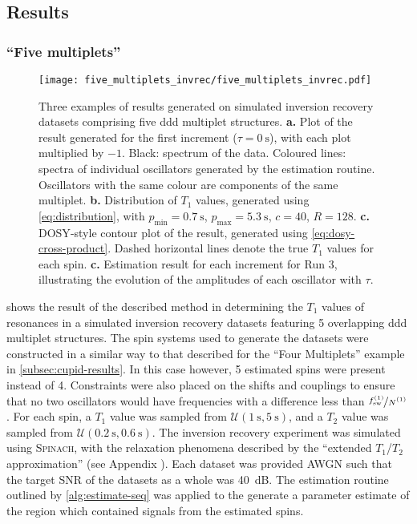 \subsection{Results}
\label{subsec:seq-results}
\subsubsection{``Five multiplets''}
\begin{figure}
    \texttt{[image: five\_multiplets\_invrec/five\_multiplets\_invrec.pdf]}
    \caption[
        Three examples of results generated on simulated inversion recovery
        datasets comprising five ddd multiplet structures.
    ]
    {
        Three examples of results generated on
        simulated inversion recovery datasets comprising five ddd multiplet
        structures.
        \textbf{a.} Plot of the result generated for the first increment ($\tau
        = \qty{0}{\second}$), with each plot multiplied by $-1$. Black:
        spectrum of the data. Coloured lines: spectra of individual oscillators
        generated by the estimation routine. Oscillators with the same colour
        are components of the same multiplet.
        \textbf{b.} Distribution of $T_1$ values, generated using
        \cref{eq:distribution}, with
        $p_{\text{min}} = \qty{0.7}{\second}$,
        $p_{\text{max}} = \qty{5.3}{\second}$,
        $c = 40$,
        $R=128$.
        \textbf{c.} \ac{DOSY}-style contour plot of the result, generated using
        \cref{eq:dosy-cross-product}.
        Dashed horizontal lines denote the true $T_1$ values for each spin.
        \textbf{c.} Estimation result for each increment for Run 3,
        illustrating the evolution of the amplitudes of each oscillator with
        $\tau$.
    }
    \label{fig:five-multiplets-invrec}
\end{figure}
 shows the result of the described
method in determining the $T_1$ values of resonances in a simulated inversion
recovery datasets featuring 5 overlapping ddd multiplet structures. The spin
systems used to generate the datasets were constructed in a similar way to that
described for the ``Four Multiplets'' example in
\cref{subsec:cupid-results}. In this case however, 5 estimated spins were
present instead of 4. Constraints were also placed on the shifts and
couplings to ensure that no two oscillators would have frequencies with a
difference less than $\nicefrac{\fswone}{\None}$ . For each spin, a $T_1$ value
was sampled from $\mathcal{U}(\qty{1}{\second}, \qty{5}{\second})$, and a $T_2$
value was sampled from  $\mathcal{U}(\qty{0.2}{\second}, \qty{0.6}{\second})$.
The inversion recovery experiment was simulated using \textsc{Spinach}, with the
relaxation phenomena described by the ``extended $T_1$/$T_2$
approximation'' (see Appendix ).
Each dataset was provided \ac{AWGN} such that the target \ac{SNR} of the
datasets as a whole was \qty{40}{\deci\bel}.
The estimation routine outlined by \cref{alg:estimate-seq} was applied
to the generate a parameter estimate of the region which contained signals from
the estimated spins.

